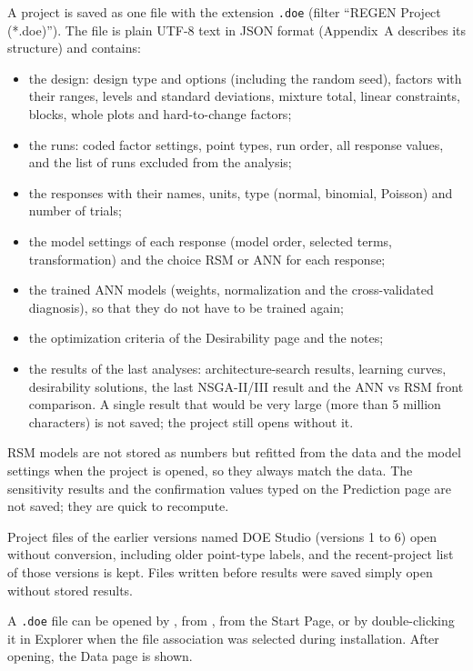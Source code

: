 A project is saved as one file with the extension \texttt{.doe} (filter ``REGEN Project (*.doe)''). The file is
plain UTF-8 text in JSON format (Appendix~A describes its structure) and contains:
\begin{itemize}
  \item the design: design type and options (including the random seed), factors with their ranges, levels and
        standard deviations, mixture total, linear constraints, blocks, whole plots and hard-to-change factors;
  \item the runs: coded factor settings, point types, run order, all response values, and the list of runs excluded
        from the analysis;
  \item the responses with their names, units, type (normal, binomial, Poisson) and number of trials;
  \item the model settings of each response (model order, selected terms, transformation) and the choice RSM or
        ANN for each response;
  \item the trained ANN models (weights, normalization and the cross-validated diagnosis), so that they do not
        have to be trained again;
  \item the optimization criteria of the Desirability page and the notes;
  \item the results of the last analyses: architecture-search results, learning curves, desirability solutions,
        the last NSGA-II/III result and the ANN vs RSM front comparison. A single result that would be very large
        (more than 5 million characters) is not saved; the project still opens without it.
\end{itemize}
RSM models are not stored as numbers but refitted from the data and the model settings when the project is opened,
so they always match the data. The sensitivity results and the confirmation values typed on the Prediction page are
not saved; they are quick to recompute.

Project files of the earlier versions named DOE Studio (versions 1 to 6) open without conversion, including older
point-type labels, and the recent-project list of those versions is kept. Files written before results were saved
simply open without stored results.

A \texttt{.doe} file can be opened by , from , from the
Start Page, or by double-clicking it in Explorer when the file association was selected during installation. After
opening, the Data page is shown.

